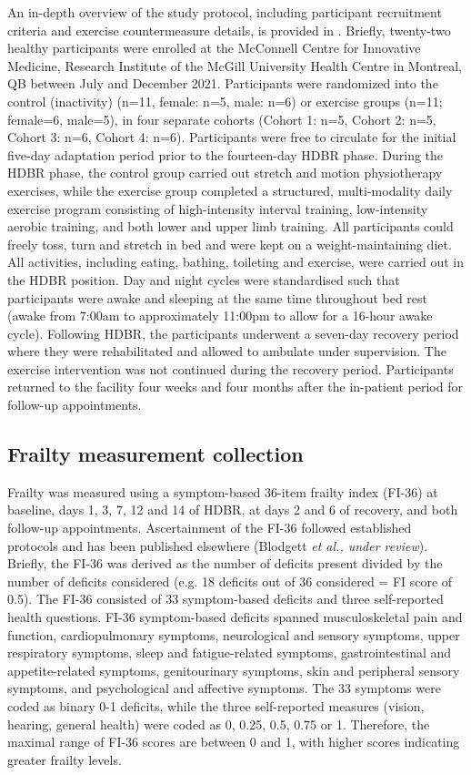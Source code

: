 \documentclass[preprint,12pt,authoryear]{elsarticle}
\begin{document}
    An in-depth overview of the study protocol, including participant recruitment criteria and exercise countermeasure details, is provided in \citep{hajj-boutrosMythsMethodologiesUnderstanding2024}. Briefly, twenty-two healthy participants were enrolled at the McConnell Centre for Innovative Medicine, Research Institute of the McGill University Health Centre in Montreal, QB between July and December 2021. Participants were randomized into the control (inactivity) (n=11, female: n=5, male: n=6) or exercise groups (n=11; female=6, male=5), in four separate cohorts (Cohort 1: n=5, Cohort 2: n=5, Cohort 3: n=6, Cohort 4: n=6). Participants were free to circulate for the initial five-day adaptation period prior to the fourteen-day HDBR phase. During the HDBR phase, the control group carried out stretch and motion physiotherapy exercises, while the exercise group completed a structured, multi-modality daily exercise program consisting of high-intensity interval training, low-intensity aerobic training, and both lower and upper limb training. All participants could freely toss, turn and stretch in bed and were kept on a weight-maintaining diet. All activities, including eating, bathing, toileting and exercise, were carried out in the HDBR position. Day and night cycles were standardised such that participants were awake and sleeping at the same time throughout bed rest (awake from 7:00am to approximately 11:00pm to allow for a 16-hour awake cycle). Following HDBR, the participants underwent a seven-day recovery period where they were rehabilitated and allowed to ambulate under supervision. The exercise intervention was not continued during the recovery period. Participants returned to the facility four weeks and four months after the in-patient period for follow-up appointments. 

\subsection{Frailty measurement collection}

    Frailty was measured using a symptom-based 36-item frailty index (FI-36) at baseline, days 1, 3, 7, 12 and 14 of HDBR, at days 2 and 6 of recovery, and both follow-up appointments. Ascertainment of the FI-36 followed established protocols \citep{theouHowConstructFrailty2023} and has been published elsewhere (Blodgett \textit{et al., under review}). Briefly, the FI-36 was derived as the number of deficits present divided by the number of deficits considered (e.g. 18 deficits out of 36 considered = FI score of 0.5). The FI-36 consisted of 33 symptom-based deficits and three self-reported health questions. FI-36 symptom-based deficits spanned musculoskeletal pain and function, cardiopulmonary symptoms, neurological and sensory symptoms, upper respiratory symptoms, sleep and fatigue-related symptoms, gastrointestinal and appetite-related symptoms, genitourinary symptoms, skin and peripheral sensory symptoms, and psychological and affective symptoms. The 33 symptoms were coded as binary 0-1 deficits, while the three self-reported measures (vision, hearing, general health) were coded as 0, 0.25, 0.5, 0.75 or 1. Therefore, the maximal range of FI-36 scores are between 0 and 1, with higher scores indicating greater frailty levels.
    
\end{document}
